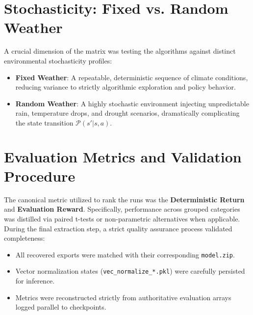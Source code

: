 \section{Stochasticity: Fixed vs. Random Weather}

A crucial dimension of the matrix was testing the algorithms against distinct environmental stochasticity profiles:
\begin{itemize}
    \item \textbf{Fixed Weather}: A repeatable, deterministic sequence of climate conditions, reducing variance to strictly algorithmic exploration and policy behavior.
    \item \textbf{Random Weather}: A highly stochastic environment injecting unpredictable rain, temperature drops, and drought scenarios, dramatically complicating the state transition $\mathcal{P}(s'|s, a)$.
\end{itemize}

\section{Evaluation Metrics and Validation Procedure}

The canonical metric utilized to rank the runs was the \textbf{Deterministic Return} and \textbf{Evaluation Reward}. Specifically, performance across grouped categories was distilled via paired t-tests or non-parametric alternatives when applicable. 
During the final extraction step, a strict quality assurance process validated completeness:
\begin{itemize}
    \item All recovered exports were matched with their corresponding \texttt{model.zip}.
    \item Vector normalization states (\texttt{vec\_normalize\_*.pkl}) were carefully persisted for inference.
    \item Metrics were reconstructed strictly from authoritative evaluation arrays logged parallel to checkpoints.
\end{itemize}
